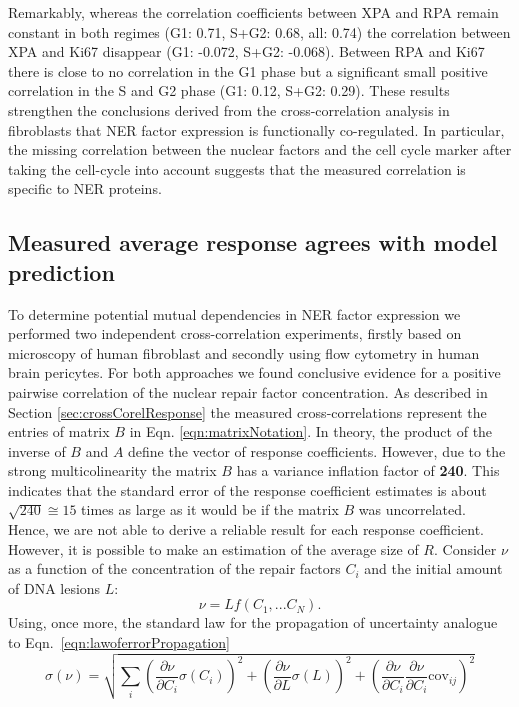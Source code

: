 Remarkably, whereas the correlation coefficients between XPA and RPA remain constant in both regimes (G1: 0.71, S+G2: 0.68, all: 0.74) the correlation between XPA and Ki67 disappear (G1: -0.072, S+G2: -0.068). Between RPA and Ki67 there is close to no correlation in the G1 phase but a significant small positive correlation in the S and G2 phase (G1: 0.12, S+G2: 0.29). These results strengthen the conclusions derived from the cross-correlation analysis in fibroblasts that NER factor expression is functionally co-regulated. In particular, the missing correlation between the nuclear factors and the cell cycle marker after taking the cell-cycle into account suggests that the measured correlation is specific to NER proteins. 


\subsection{Measured average response agrees with model prediction}
To determine potential mutual dependencies in NER factor expression we performed two independent cross-correlation experiments, firstly based on microscopy of human fibroblast and secondly using flow cytometry in human brain pericytes. For both approaches we found conclusive evidence for a positive pairwise correlation of the nuclear repair factor concentration. As described in Section \ref{sec:crossCorelResponse} the measured cross-correlations represent the entries of matrix $B$ in Eqn. \ref{eqn:matrixNotation}. In theory, the product of the inverse of $B$ and $A$ define the vector of response coefficients. However, due to the strong multicolinearity the matrix $B$ has a variance inflation factor of \textbf{240}. This indicates that the standard error of the response coefficient estimates is about $\sqrt{240} \cong 15$ times as large as it would be if the matrix $B$ was uncorrelated.\\   
Hence, we are not able to derive a reliable result for each response coefficient. However, it is possible to make an estimation of the average size of $R$. Consider $\nu$ as a function of the concentration of the repair factors $C_i$ and the initial amount of DNA lesions $L$:
\begin{equation}
	\nu = Lf(C_1,...C_N).
\end{equation}
Using, once more, the standard law for the propagation of uncertainty analogue to Eqn.\ \ref{eqn:lawoferrorPropagation}
 \begin{equation}
 \sigma(\nu) = \sqrt{\sum_{i}\left(\frac{\partial \nu}{\partial C_i}\sigma(C_i) \right)^2 + \left(\frac{\partial \nu}{\partial L}\sigma(L)\right)^2 + \left(\frac{\partial \nu}{\partial C_i} \frac{\partial \nu}{\partial C_i}\textrm{cov}_{ij}\right)^2}
 \end{equation}  
 
